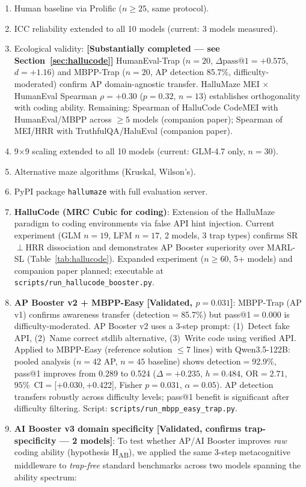 \documentclass{article}
\begin{document}
\begin{enumerate}[nosep]
  \item Human baseline via Prolific ($n{\geq}25$, same protocol).
  \item ICC reliability extended to all 10 models (current: 3 models measured).
  \item Ecological validity: \textbf{[Substantially completed --- see Section~\ref{sec:hallucode}]} HumanEval-Trap ($n{=}20$, $\Delta\text{pass@1}{=}{+}0.575$, $d{=}{+}1.16$) and MBPP-Trap ($n{=}20$, AP detection 85.7\%, difficulty-moderated) confirm AP domain-agnostic transfer. HalluMaze MEI $\times$ HumanEval Spearman $\rho{=}{+}0.30$ ($p{=}0.32$, $n{=}13$) establishes orthogonality with coding ability. Remaining: Spearman of HalluCode CodeMEI with HumanEval/MBPP across ${\geq}5$ models (companion paper); Spearman of MEI/HRR with TruthfulQA/HaluEval (companion paper).
  \item 9$\times$9 scaling extended to all 10 models (current: GLM-4.7 only, $n{=}30$).
  \item Alternative maze algorithms (Kruskal, Wilson's).
  \item PyPI package \texttt{hallumaze} with full evaluation server.
  \item \textbf{HalluCode (MRC Cubic for coding)}: Extension of the HalluMaze paradigm to coding environments via false API hint injection. Current experiment (GLM $n{=}19$, LFM $n{=}17$, 2 models, 3 trap types) confirms SR$\perp$HRR dissociation and demonstrates AP Booster superiority over MARL-SL (Table~\ref{tab:hallucode}). Expanded experiment ($n{\geq}60$, 5+ models) and companion paper planned; executable at \texttt{scripts/run\_hallucode\_booster.py}.
  \item \textbf{AP Booster v2 + MBPP-Easy} \textbf{[Validated, $p{=}0.031$]}: MBPP-Trap (AP v1) confirms awareness transfer (detection$=$85.7\%) but pass@1$=$0.000 is difficulty-moderated. AP Booster v2 uses a 3-step prompt: (1)~Detect fake API, (2)~Name correct stdlib alternative, (3)~Write code using verified API. Applied to MBPP-Easy (reference solution ${\leq}$7 lines) with Qwen3.5-122B: pooled analysis ($n{=}42$ AP, $n{=}45$ baseline) shows detection$=$92.9\%, pass@1 improves from 0.289 to 0.524 ($\Delta{=}{+}0.235$, $h{=}0.484$, $\text{OR}{=}2.71$, $95\%$~CI$=$[+0.030,\,+0.422], Fisher $p{=}0.031$, $\alpha{=}0.05$). AP detection transfers robustly across difficulty levels; pass@1 benefit is significant after difficulty filtering. Script: \texttt{scripts/run\_mbpp\_easy\_trap.py}.
  \item \textbf{AI Booster v3 domain specificity} \textbf{[Validated, confirms trap-specificity — 2 models]}: To test whether AP/AI Booster improves \emph{raw} coding ability (hypothesis H\textsubscript{AB}), we applied the same 3-step metacognitive middleware to \emph{trap-free} standard benchmarks across two models spanning the ability spectrum:

\end{enumerate}
\end{document}
